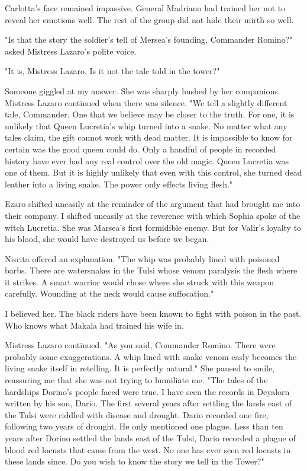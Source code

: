 \documentclass{article}
\begin{document}
Carlotta's face remained impassive. General Madriano had trained her not to reveal her emotions well. The rest of the group did not hide their mirth so well. 

"Is that the story the soldier's tell of Mersea's founding, Commander Romino?" asked Mistress Lazaro's polite voice. 

"It is, Mistress Lazaro. Is it not the tale told in the tower?"

Someone giggled at my answer. She was sharply hushed by her companions. Mistress Lazaro continued when there was silence. "We tell a slightly different tale, Commander. One that we believe may be closer to the truth. For one, it is unlikely that Queen Lucretia's whip turned into a snake. No matter what any tales claim, the gift cannot work with dead matter. It is impossible to know for certain was the good queen could do. Only a handful of people in recorded history have ever had any real control over the old magic. Queen Lucretia was one of them. But it is highly unlikely that even with this control, she turned dead leather into a living snake. The power only effects living flesh."

Ezaro shifted uneasily at the reminder of the argument that had brought me into their company. I shifted uneasily at the reverence with which Sophia spoke of the witch Lucretia. She was Marsea's first formidible enemy. But for Valir's loyalty to his blood, she would have destroyed us before we began.

Nisrita offered an explanation. "The whip was probably lined with poisoned barbs. There are watersnakes in the Tulsi whose venom paralysis the flesh where it strikes. A smart warrior would chose where she struck with this weapon carefully. Wounding at the neck would cause suffocation." 

I believed her. The black riders have been known to fight with poison in the past. Who knows what Makala had trained his wife in.

Mistress Lazaro continued. "As you said, Commander Romino. There were probably some exaggerations. A whip lined with snake venom easly becomes the living snake itself in retelling. It is perfectly natural." She paused to smile, reassuring me that she was not trying to humiliate me. "The tales of the hardships Dorino's people faced were true. I have seen the records in Deyalorn written by his son, Dario. The first several years after settling the lands east of the Tulsi were riddled with disease and drought. Dario recorded one fire, following two years of drought. He only mentioned one plague. Less than ten years after Dorino settled the lands east of the Tulsi, Dario recorded a plague of blood red locusts that came from the west. No one has ever seen red locusts in these lands since. Do you wish to know the story we tell in the Tower?"
\end{document}
